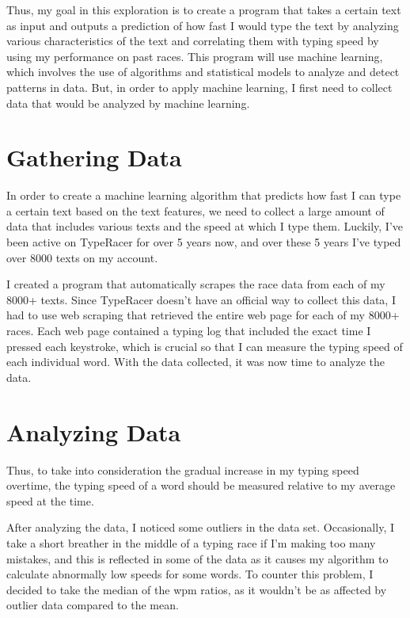 \documentclass[12pt]{article}
\begin{document}
Thus, my goal in this exploration is to create a program that takes a certain text as input and outputs a prediction of how fast I would type the text by analyzing various characteristics of the text and correlating them with typing speed by using my performance on past races. This program will use machine learning, which involves the use of algorithms and statistical models to analyze and detect patterns in data. But, in order to apply machine learning, I first need to collect data that would be analyzed by machine learning.

\section*{Gathering Data}

In order to create a machine learning algorithm that predicts how fast I can type a certain text based on the text features, we need to collect a large amount of data that includes various texts and the speed at which I type them. Luckily, I've been active on TypeRacer for over 5 years now, and over these 5 years I've typed over 8000 texts on my account.

I created a program that automatically scrapes the race data from each of my 8000+ texts. Since TypeRacer doesn't have an official way to collect this data, I had to use web scraping that retrieved the entire web page for each of my 8000+ races. Each web page contained a typing log that included the exact time I pressed each keystroke, which is crucial so that I can measure the typing speed of each individual word. With the data collected, it was now time to analyze the data.

\section*{Analyzing Data}

Thus, to take into consideration the gradual increase in my typing speed overtime, the typing speed of a word should be measured relative to my average speed at the time.

After analyzing the data, I noticed some outliers in the data set. Occasionally, I take a short breather in the middle of a typing race if I'm making too many mistakes, and this is reflected in some of the data as it causes my algorithm to calculate abnormally low speeds for some words. To counter this problem, I decided to take the median of the wpm ratios, as it wouldn't be as affected by outlier data compared to the mean.
\end{document}
